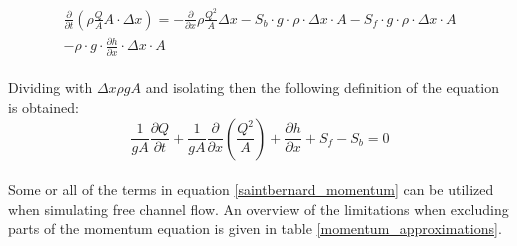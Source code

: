 \begin{equation}
\begin{array}{l}
\frac{\partial}{\partial t} (\rho \frac{Q}{A}A\cdot \Delta x) = - \frac{\partial}{\partial x} \rho \frac{Q^2}{A}\Delta x -S_b \cdot g \cdot \rho \cdot \Delta x \cdot A -S_f \cdot g \cdot \rho \cdot \Delta x \cdot A \\ 
-\rho\cdot g \cdot \frac{\partial h}{\partial x} \cdot \Delta x \cdot A 

\end{array}
\end{equation}
\\
Dividing with $\Delta x \rho g A$ and isolating then the following definition of the equation is obtained:
\\
\begin{equation}
\boxed{\frac{1}{gA} \frac{\partial Q}{\partial t} +\frac{1}{gA}\frac{\partial}{\partial x} \left( \frac{Q^2}{A} \right) + \frac{\partial h}{\partial x} + S_f - S_b = 0}
\label{saintbernard_momentum}
\end{equation}
\\

Some or all of the terms in equation \ref{saintbernard_momentum} can be utilized when simulating free channel flow. An overview of the limitations when excluding parts of the momentum equation is given in table \ref{momentum_approximations}.

